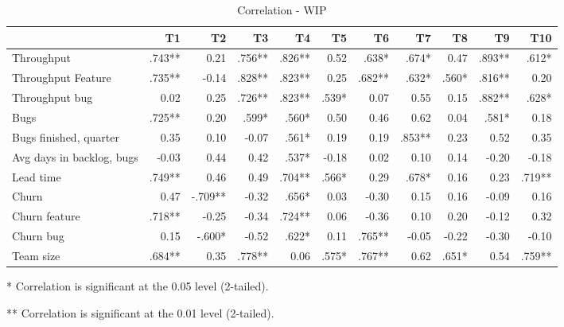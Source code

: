 \documentclass[UKenglish]{ifimaster}  %
\begin{document}
\begin{table}[!htbp]
 \begin{adjustwidth}{-2.5cm}{}
 \centering
 \begin{tabular}{|l|r|r|r|r|r|r|r|r|r|r|}
\hline
 & \bf{T1} & \bf{T2} & \bf{T3} & \bf{T4} & \bf{T5} & \bf{T6} & \bf{T7} & \bf{T8} & \bf{T9} & \bf{T10}\\ \hline
Throughput &.743**& 0.21& .756**& .826**& 0.52& .638*& .674*& 0.47& .893**& .612*\\ \hline
Throughput Feature &.735**& -0.14& .828**& .823**& 0.25& .682**& .632*& .560*& .816**& 0.20\\ \hline
Throughput bug &0.02& 0.25& .726**& .823**& .539*& 0.07& 0.55& 0.15& .882**& .628*\\ \hline
Bugs &.725**& 0.20& .599*& .560*& 0.50& 0.46& 0.62& 0.04& .581*& 0.18\\ \hline
Bugs finished, quarter &0.35& 0.10& -0.07& .561*& 0.19& 0.19& .853**& 0.23& 0.52& 0.35\\ \hline
Avg days in backlog, bugs &-0.03& 0.44& 0.42& .537*& -0.18& 0.02& 0.10& 0.14& -0.20& -0.18\\ \hline
Lead time &.749**& 0.46& 0.49& .704**& .566*& 0.29& .678*& 0.16& 0.23& .719**\\ \hline
Churn &0.47& -.709**& -0.32& .656*& 0.03& -0.30& 0.15& 0.16& -0.09& 0.16\\ \hline
Churn feature &.718**& -0.25& -0.34& .724**& 0.06& -0.36& 0.10& 0.20& -0.12& 0.32\\ \hline
Churn bug &0.15& -.600*& -0.52& .622*& 0.11& .765**& -0.05& -0.22& -0.30& -0.10\\ \hline
Team size &.684**
& 0.35& .778**
& 0.06& .575*
& .767**
& 0.62& .651*
& 0.54& .759**
\\ \hline
\end{tabular}
 \caption{Correlation - WIP}
\label{corr:WIP}
 \centerline {* Correlation is significant at the 0.05 level (2-tailed).}
\centerline{** Correlation is significant at the 0.01 level (2-tailed).}
\end{adjustwidth}
\end{table}
\newpage
\end{document}
